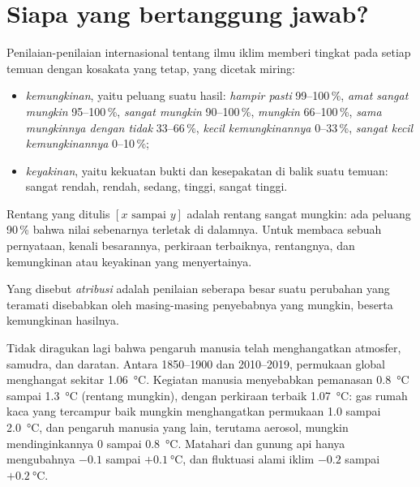 \section{Siapa yang bertanggung jawab?}

\begin{method}\label{met:g12:climate-change:language}
Penilaian-penilaian internasional tentang ilmu iklim memberi tingkat pada setiap
temuan dengan kosakata yang tetap, yang dicetak miring:
\begin{itemize}
  \item \emph{kemungkinan}, yaitu peluang suatu hasil:
        \emph{hampir pasti} 99--100\,\%, \emph{amat sangat mungkin}
        95--100\,\%, \emph{sangat mungkin} 90--100\,\%, \emph{mungkin}
        66--100\,\%, \emph{sama mungkinnya dengan tidak} 33--66\,\%,
        \emph{kecil kemungkinannya} 0--33\,\%, \emph{sangat kecil kemungkinannya} 0--10\,\%;
  \item \emph{keyakinan}, yaitu kekuatan bukti dan kesepakatan di balik suatu
        temuan: sangat rendah, rendah, sedang, tinggi, sangat tinggi.
\end{itemize}
Rentang yang ditulis $[x \text{ sampai } y]$ adalah rentang sangat mungkin:
ada peluang 90\,\% bahwa nilai sebenarnya terletak di dalamnya. Untuk membaca
sebuah pernyataan, kenali besarannya, perkiraan terbaiknya, rentangnya, dan
kemungkinan atau keyakinan yang menyertainya.
\end{method}

\begin{definition}[Atribusi]\label{def:g12:climate-change:attribution}
Yang disebut \emph{atribusi} adalah penilaian seberapa besar
suatu perubahan yang teramati disebabkan oleh masing-masing penyebabnya yang
mungkin, beserta kemungkinan hasilnya.
\end{definition}

\begin{proposition}\label{prop:g12:climate-change:attribution}
Tidak diragukan lagi bahwa pengaruh manusia telah menghangatkan atmosfer,
samudra, dan daratan. Antara 1850--1900 dan 2010--2019, permukaan global
menghangat sekitar \qty{1.06}{\degreeCelsius}. Kegiatan manusia menyebabkan
pemanasan \qty{0.8}{\degreeCelsius} sampai \qty{1.3}{\degreeCelsius} (rentang
mungkin), dengan perkiraan terbaik \qty{1.07}{\degreeCelsius}: gas rumah kaca
yang tercampur baik mungkin menghangatkan permukaan 1.0 sampai
\qty{2.0}{\degreeCelsius}, dan pengaruh manusia yang lain, terutama aerosol,
mungkin mendinginkannya 0 sampai \qty{0.8}{\degreeCelsius}. Matahari dan gunung
api hanya mengubahnya $-0.1$ sampai $+\qty{0.1}{\degreeCelsius}$, dan fluktuasi
alami iklim $-0.2$ sampai $+\qty{0.2}{\degreeCelsius}$.
\end{proposition}

